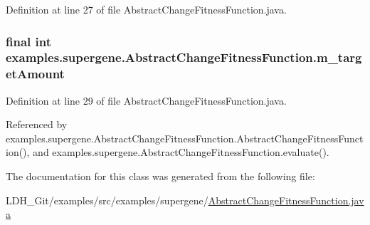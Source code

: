 Definition at line 27 of file Abstract\-Change\-Fitness\-Function.\-java.

\hypertarget{classexamples_1_1supergene_1_1_abstract_change_fitness_function_af113260ddde2433a26a6a266b2969e56}{
\subsubsection[{m\-\_\-target\-Amount}]{\setlength{\rightskip}{0pt plus 5cm}final int examples.\-supergene.\-Abstract\-Change\-Fitness\-Function.\-m\-\_\-target\-Amount\hspace{0.3cm}{\ttfamily [private]}}}\label{classexamples_1_1supergene_1_1_abstract_change_fitness_function_af113260ddde2433a26a6a266b2969e56}


Definition at line 29 of file Abstract\-Change\-Fitness\-Function.\-java.



Referenced by examples.\-supergene.\-Abstract\-Change\-Fitness\-Function.\-Abstract\-Change\-Fitness\-Function(), and examples.\-supergene.\-Abstract\-Change\-Fitness\-Function.\-evaluate().



The documentation for this class was generated from the following file\-:\begin{DoxyCompactItemize}
\item 
L\-D\-H\-\_\-\-Git/examples/src/examples/supergene/\hyperlink{_abstract_change_fitness_function_8java}{Abstract\-Change\-Fitness\-Function.\-java}\end{DoxyCompactItemize}
